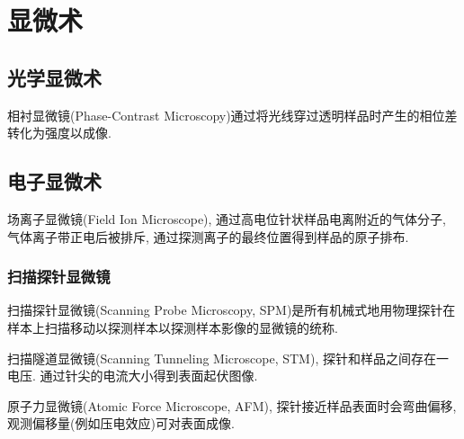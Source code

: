 \documentclass[hidelinks]{ctexart}
\begin{document}
\section{显微术} %
\label{sec:显微术}

\subsection{光学显微术} %
\label{sub:光学显微术}

相衬显微镜(Phase-Contrast Microscopy)通过将光线穿过透明样品时产生的相位差转化为强度以成像.


\subsection{电子显微术} %
\label{sub:电子显微术}

场离子显微镜(Field Ion Microscope), 通过高电位针状样品电离附近的气体分子, 气体离子带正电后被排斥, 通过探测离子的最终位置得到样品的原子排布.

\subsubsection{扫描探针显微镜} %
\label{ssub:扫描探针显微镜}

扫描探针显微镜(Scanning Probe Microscopy, SPM)是所有机械式地用物理探针在样本上扫描移动以探测样本以探测样本影像的显微镜的统称.
\par
扫描隧道显微镜(Scanning Tunneling Microscope, STM), 探针和样品之间存在一电压. 通过针尖的电流大小得到表面起伏图像.
\par
原子力显微镜(Atomic Force Microscope, AFM), 探针接近样品表面时会弯曲偏移, 观测偏移量(例如压电效应)可对表面成像.



\end{document}
